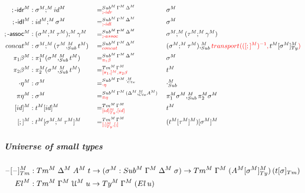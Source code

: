 \documentclass[a4paper,UKenglish,numberwithinsect,cleveref,thm-restate]{lipics-v2021}
\begin{document}
\begin{alignat*}{5}
  ;\text{-}\textsf{idr}^M   & : \sigma^M ;^M \idS^M && =^{\Sub^M\,\Gamma^M\,\Delta^M}_{\alert{;\text{-}\mathsf{idr}}} && \sigma^M \\
  ;\text{-}\textsf{idl}^M   & : \idS^M ;^M \sigma^M && =^{\Sub^M\,\Gamma^M\,\Delta^M}_{\alert{;\text{-}\mathsf{idl}}} && \sigma^M \\
  ;\text{-}\textsf{assoc}^M & : (\sigma^M ;^M \tau^M) ;^M \gamma^M   && =^{\Sub^M\,\Gamma^M\,\Delta^M}_{\alert{;\text{-}\mathsf{assoc}}} && \sigma^M ;^M (\tau^M ;^M \gamma^M) \\
  \mathsf{concat}^M         & : \sigma^M ;^M (\tau^M ,_{\Sub}^M t^M) && =^{\Sub^M\,\Gamma^M\,\Delta^M}_{\alert{\mathsf{concat}}} && (\sigma^M ;^M \tau^M) ,_{\Sub}^M \alert{\transfib{}{([;]^M)^{-1}}{\color{black}t^M [\sigma^M]_{\Ty}^M}} \\
  \pi_1\beta^M              & : \pi_1^M (\sigma^M ,^M_{\Sub} t^M)    && =^{\Sub^M\,\Gamma^M\,\Delta^M}_{\alert{\pi_1\beta}}      && \sigma^M \\
  \pi_2\beta^M              & : \pi_2^M (\sigma^M ,^M_{\Sub} t^M)    && =^{\Tm^M\,\Gamma^M}_{\alert{[\pi_1,]^M, \pi_2\beta}}       && t^M \\
  \cdot\eta^M               & : \sigma^M                             && =^{\Sub^M\,\Gamma^M\,\emptyctx^M_{\Ctx}}_{\alert{\cdot\eta}}  && \emptysub_{\Sub}^M \\
  \pi\eta^M                 & : \sigma^M                             && =^{\Sub^M\,\Gamma^M\,(\Delta^M ,^M_{\Ctx} A^M)}_{\alert{\pi\eta}} {} && \pi_1^M \sigma^M ,_{\Sub}^M \pi_2^M \sigma^M \\
  [\idS]^M                  & : t^M [ \idS ]^M                      && =^{\Tm^M\,\Gamma^M}_{\alert{[\idS]^M_{\Ty}, [\idS]}} && t^M \\
  [;]^M                     & : t^M [ \sigma^M ;^M \tau^M ]^M       && =^{\Tm^M\,\Gamma^M}_{\alert{[;]^M_{\Ty}, [;]}} && (t^M [\tau^M]^M) [\sigma^M]^M
\end{alignat*}

\subparagraph*{Universe of small types}
\begin{alignat*}{10}
  \blank[\blank]_{\Tm}^M & : \Tm^M\;\Delta^M\;A^M\;t \to (\sigma^M : \Sub^M\;\Gamma^M\;\Delta^M\;\sigma) \to \Tm^M\;\Gamma^M\;(A^M [\sigma^M]_{\Ty}^M)\,(\subTm{t}{\sigma}) \\
  \El^M                  & : \Tm^M\;\Gamma^M\;\UU^M\;u \to \Ty^M\;\Gamma^M\;(\El\,u)
\end{alignat*}
\end{document}
